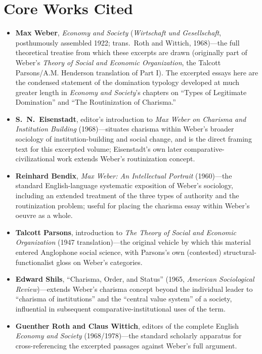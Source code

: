 \documentclass[12pt]{article}
\begin{document}
\section{Core Works Cited}

\begin{itemize}[leftmargin=*, itemsep=4pt]
    \item \textbf{Max Weber}, \textit{Economy and Society} (\textit{Wirtschaft und Gesellschaft}, posthumously assembled 1922; trans.\ Roth and Wittich, 1968)---the full theoretical treatise from which these excerpts are drawn (originally part of Weber's \textit{Theory of Social and Economic Organization}, the Talcott Parsons/A.M. Henderson translation of Part I). The excerpted essays here are the condensed statement of the domination typology developed at much greater length in \textit{Economy and Society}'s chapters on ``Types of Legitimate Domination'' and ``The Routinization of Charisma.''
    \item \textbf{S.\ N.\ Eisenstadt}, editor's introduction to \textit{Max Weber on Charisma and Institution Building} (1968)---situates charisma within Weber's broader sociology of institution-building and social change, and is the direct framing text for this excerpted volume; Eisenstadt's own later comparative-civilizational work extends Weber's routinization concept.
    \item \textbf{Reinhard Bendix}, \textit{Max Weber: An Intellectual Portrait} (1960)---the standard English-language systematic exposition of Weber's sociology, including an extended treatment of the three types of authority and the routinization problem; useful for placing the charisma essay within Weber's oeuvre as a whole.
    \item \textbf{Talcott Parsons}, introduction to \textit{The Theory of Social and Economic Organization} (1947 translation)---the original vehicle by which this material entered Anglophone social science, with Parsons's own (contested) structural-functionalist gloss on Weber's categories.
    \item \textbf{Edward Shils}, ``Charisma, Order, and Status'' (1965, \textit{American Sociological Review})---extends Weber's charisma concept beyond the individual leader to ``charisma of institutions'' and the ``central value system'' of a society, influential in subsequent comparative-institutional uses of the term.
    \item \textbf{Guenther Roth and Claus Wittich}, editors of the complete English \textit{Economy and Society} (1968/1978)---the standard scholarly apparatus for cross-referencing the excerpted passages against Weber's full argument.
\end{itemize}
\end{document}
